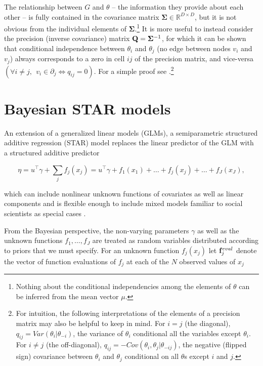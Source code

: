 The relationship between $G$ and $\theta$ -- the information they provide about each other -- is fully contained in the covariance matrix $\boldsymbol{\Sigma} \in \mathbb{R}^{D\times D}$, but it is not obvious from the individual elements of $\boldsymbol{\Sigma}$.\footnote{Nothing about the conditional independencies among the elements of $\theta$ can be inferred from the mean vector $\mu$.} It is more useful to instead consider the precision (inverse covariance) matrix $\mathbf{Q} =\boldsymbol{\Sigma}^{-1}$, for which it can be shown that conditional independence between $\theta_i$ and $\theta_j$ (no edge between nodes $v_i$ and $v_j$) always corresponds to a zero in cell $ij$ of the precision matrix, and vice-versa $(\forall i \neq j, \:\: v_i \in \partial_j \iff q_{ij} = 0)$.  For a simple proof see .\footnote{For intuition, the following interpretations of the elements of a precision matrix may also be helpful to keep in mind. For $i = j$ (the diagonal),  $q_{ij} = Var(\theta_i | \theta_{-i})$, the variance of $\theta_i$ conditional all the variables except $\theta_i$. For $i \neq j$ (the off-diagonal), $q_{ij}  = -Cov(\theta_i, \theta_j | \theta_{-ij}) $, the negative (flipped sign) covariance between $\theta_i$ and $\theta_j$ conditional on all $\theta$s except $i$ and $j$.  }






\section{Bayesian STAR models}
\label{star}

An extension of a generalized linear models (GLMs), a semiparametric structured additive regression (STAR) model replaces the linear predictor of the GLM with a structured additive predictor

\begin{equation*}
\eta =  u^\intercal\gamma + \sum_{j} f_j (x_j) =  u^\intercal\gamma + f_1(x_1) + \ldots + f_j(x_j) + \ldots + f_J(x_J),
\end{equation*}

\noindent which can include nonlinear unknown functions of covariates as well as linear components and is flexible enough to include mixed models familiar to social scientists as special cases . 

From the Bayesian perspective, the non-varying parameters $\gamma$ as well as the unknown functions $f_1, \dots, f_J$ are treated as random variables distributed according to priors that we must specify. For an unknown function $f_j(x_j)$ let $\mathbf{f}_j^{eval}$ denote the vector of function evaluations of $f_j$ at each of the $N$ observed values of $x_j$ 

